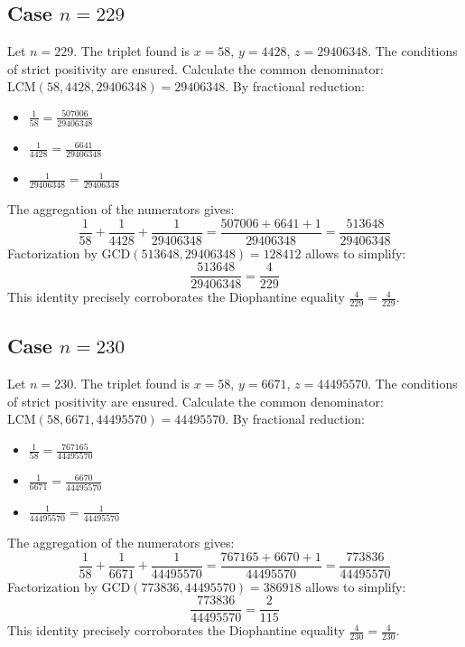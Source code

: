\documentclass[11pt,a4paper]{article}
\begin{document}
\subsection{Case $n = 229$}
Let $n = 229$. The triplet found is $x = 58$, $y = 4428$, $z = 29406348$.
The conditions of strict positivity are ensured.
Calculate the common denominator: $\text{LCM}(58, 4428, 29406348) = 29406348$.
By fractional reduction:
\begin{itemize}
    \item $\frac{1}{58} = \frac{507006}{29406348}$
    \item $\frac{1}{4428} = \frac{6641}{29406348}$
    \item $\frac{1}{29406348} = \frac{1}{29406348}$
\end{itemize}
The aggregation of the numerators gives:
$$ \frac{1}{58} + \frac{1}{4428} + \frac{1}{29406348} = \frac{507006 + 6641 + 1}{29406348} = \frac{513648}{29406348} $$
Factorization by $\text{GCD}(513648, 29406348) = 128412$ allows to simplify:
$$ \frac{513648}{29406348} = \frac{4}{229} $$
This identity precisely corroborates the Diophantine equality $\frac{4}{229} = \frac{4}{229}$.

\subsection{Case $n = 230$}
Let $n = 230$. The triplet found is $x = 58$, $y = 6671$, $z = 44495570$.
The conditions of strict positivity are ensured.
Calculate the common denominator: $\text{LCM}(58, 6671, 44495570) = 44495570$.
By fractional reduction:
\begin{itemize}
    \item $\frac{1}{58} = \frac{767165}{44495570}$
    \item $\frac{1}{6671} = \frac{6670}{44495570}$
    \item $\frac{1}{44495570} = \frac{1}{44495570}$
\end{itemize}
The aggregation of the numerators gives:
$$ \frac{1}{58} + \frac{1}{6671} + \frac{1}{44495570} = \frac{767165 + 6670 + 1}{44495570} = \frac{773836}{44495570} $$
Factorization by $\text{GCD}(773836, 44495570) = 386918$ allows to simplify:
$$ \frac{773836}{44495570} = \frac{2}{115} $$
This identity precisely corroborates the Diophantine equality $\frac{4}{230} = \frac{4}{230}$.
\end{document}
